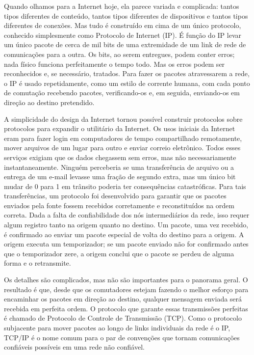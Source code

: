 Quando olhamos para a Internet hoje, ela parece variada e complicada: tantos tipos
diferentes de conteúdo, tantos tipos diferentes de dispositivos e tantos tipos diferentes
de conexões. Mas tudo é construído em cima de um único protocolo, conhecido simplesmente
como Protocolo de Internet (IP). É função do IP levar um único pacote de cerca de mil bits
de uma extremidade de um link de rede de comunicações para a outra. Os bits, ao serem
entregues, podem conter erros; nada físico funciona perfeitamente o tempo todo. Mas os
erros podem ser reconhecidos e, se necessário, tratados. Para fazer os pacotes atravessarem
a rede, o IP é usado repetidamente, como um estilo de corrente humana, com cada ponto de
comutação recebendo pacotes, verificando-os e, em seguida, enviando-os em direção ao destino
pretendido.

A simplicidade do design da Internet tornou possível construir protocolos sobre protocolos
para expandir o utilitário da Internet. Os usos iniciais da Internet eram para fazer login
em computadores de tempo compartilhado remotamente, mover arquivos de um lugar para outro
e enviar correio eletrônico. Todos esses serviços exigiam que os dados chegassem sem
erros, mas não necessariamente instantaneamente. Ninguém perceberia se uma transferência
de arquivo ou a entrega de um e-mail levasse uma fração de segundo extra, mas um único bit
mudar de 0 para 1 em trânsito poderia ter consequências catastróficas. Para tais
transferências, um protocolo foi desenvolvido para garantir que os pacotes enviados pela
fonte fossem recebidos corretamente e reconstituídos na ordem correta. Dada a falta de
confiabilidade dos nós intermediários da rede, isso requer algum registro tanto na origem
quanto no destino. Um pacote, uma vez recebido, é confirmado ao enviar um pacote especial
de volta do destino para a origem. A origem executa um temporizador; se um pacote enviado
não for confirmado antes que o temporizador zere, a origem conclui que o pacote se perdeu
de alguma forma e o retransmite.

Os detalhes são complicados, mas não são importantes para o panorama geral. O resultado é
que, desde que os comutadores estejam fazendo o melhor esforço para encaminhar os pacotes
em direção ao destino, qualquer mensagem enviada será recebida em perfeita ordem. O
protocolo que garante essas transmissões perfeitas é chamado de Protocolo de Controle de
Transmissão (TCP). Como o protocolo subjacente para mover pacotes ao longo de links
individuais da rede é o IP, TCP/IP é o nome comum para o par de convenções que tornam
comunicações confiáveis possíveis em uma rede não confiável.

